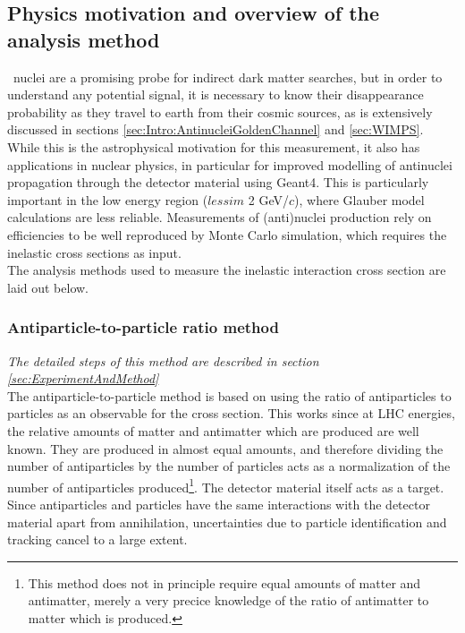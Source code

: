 \subsection{Physics motivation and overview of the analysis method}
\ahe\ nuclei are a promising probe for indirect dark matter searches, but in order to understand any potential signal, it is necessary to know their disappearance probability as they travel to earth from their cosmic sources, as is extensively discussed in sections \ref{sec:Intro:AntinucleiGoldenChannel} and \ref{sec:WIMPS}. While this is the astrophysical motivation for this measurement, it also has applications in nuclear physics, in particular for improved modelling of antinuclei propagation through the detector material using Geant4. This is particularly important in the low energy region ($lessim$ 2 GeV/$c$), where Glauber model calculations are less reliable. Measurements of (anti)nuclei production rely on efficiencies to be well reproduced by Monte Carlo simulation, which requires the inelastic cross sections as input. \\ 
The analysis methods used to measure the inelastic interaction cross section are laid out below. 
\subsubsection{Antiparticle-to-particle ratio method}
\textit{The detailed steps of this method are described in section \ref{sec:ExperimentAndMethod}}\\
The antiparticle-to-particle method is based on using the ratio of antiparticles to particles as an observable for the cross section. This works since at LHC energies, the relative amounts of matter and antimatter which are produced are well known. They are produced in almost equal amounts, and therefore dividing the number of antiparticles by the number of particles acts as a normalization of the number of antiparticles produced\footnote{This method does not in principle require equal amounts of matter and antimatter, merely a very precice knowledge of the ratio of antimatter to matter which is produced.}. The detector material itself acts as a target. Since antiparticles and particles have the same interactions with the detector material apart from annihilation, uncertainties due to particle identification and tracking cancel to a large extent. 
